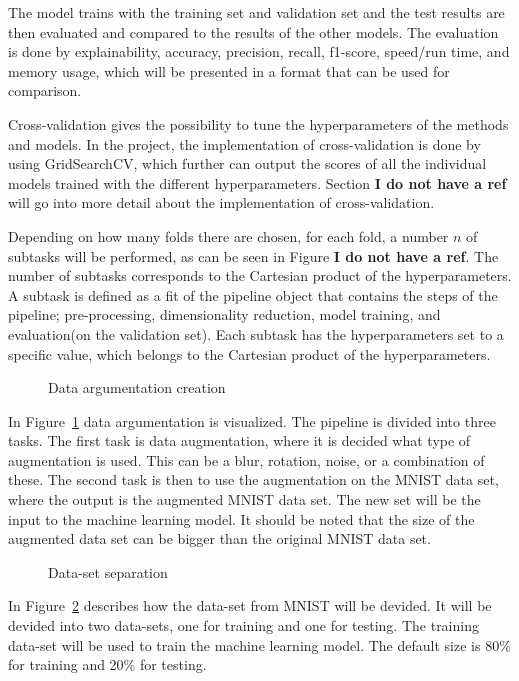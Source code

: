 The model trains with the training set and validation set and the test results are then evaluated and compared to the results of the other models. The evaluation is done by explainability, accuracy, precision, recall, f1-score, speed/run time, and memory usage, which will be presented in a format that can be used for comparison.

 
Cross-validation gives the possibility to tune the hyperparameters of the methods and models. In the project, the implementation of cross-validation is done by using GridSearchCV, which further can output the scores of all the individual models trained with the different hyperparameters. Section \textbf{I do not have a ref} will go into more detail about the implementation of cross-validation.

Depending on how many folds there are chosen, for each fold, a number $n$ of subtasks will be performed, as can be seen in Figure \textbf{I do not have a ref}. The number of subtasks corresponds to the Cartesian product of the hyperparameters. A subtask is defined as a fit of the pipeline object that contains the steps of the pipeline; pre-processing, dimensionality reduction, model training, and evaluation(on the validation set). Each subtask has the hyperparameters set to a specific value, which belongs to the Cartesian product of the hyperparameters.


\begin{figure}[htb!]
    \centering
    
    \caption{Data argumentation creation}
    \label{fig:data-argumentation-create}
\end{figure}

In Figure~\ref{fig:data-argumentation-create} data argumentation is visualized. The pipeline is divided into three tasks. The first task is data augmentation, where it is decided what type of augmentation is used. This can be a blur, rotation, noise, or a combination of these. The second task is then to use the augmentation on the MNIST data set, where the output is the augmented MNIST data set. The new set will be the input to the machine learning model. It should be noted that the size of the augmented data set can be bigger than the original MNIST data set.

\begin{figure}[htb!]
    \centering
    
    \caption{Data-set separation}
    \label{fig:data-set-sepa}
\end{figure}

In Figure~\ref{fig:data-set-sepa} describes how the data-set from MNIST will be devided. It will be devided into two data-sets, one for training and one for testing. The training data-set will be used to train the machine learning model. The default size is 80\% for training and 20\% for testing.